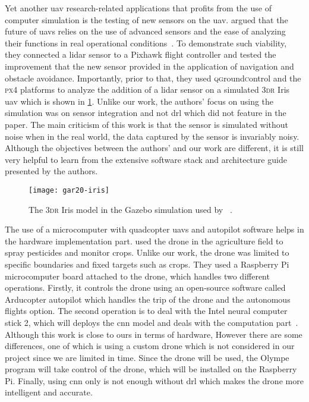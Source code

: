\documentclass[../main.tex]{subfiles}
\begin{document}
Yet another \gls{uav} research-related applications 
that profits from the use of computer simulation 
is the testing of new sensors on the \gls{uav}.
\citeauthor{Gar20} argued that the future of \glspl{uav}
relies on the use of advanced sensors and 
the ease of analyzing their functions
in real operational conditions~\cite{Gar20}.
To demonstrate such viability, they connected a \gls{lidar} sensor
to a Pixhawk flight controller and tested the improvement
that the new sensor provided
in the application of navigation and obstacle avoidance.
Importantly, prior to that, they used \textsc{qg}round\textsc{c}ontrol and the \textsc{px}4
platforms to analyze the addition of a \gls{lidar} sensor
on a simulated 3\textsc{dr} Iris \gls{uav} which is shown
in \cref{fig:gar20}.
Unlike our work, the authors' focus on using the simulation
was on sensor integration and not \gls{drl} 
which did not feature in the paper. 
The main criticism of this work is that 
the sensor is simulated without noise
when in the real world, the data captured
by the sensor is invariably noisy.
Although the objectives between the authors' and our work
are different, it is still very helpful to learn from
the extensive software stack and architecture guide 
presented by the authors.

\begin{figure}[tb] 
    \centering
    \texttt{[image: gar20-iris]} 
    \caption[The 3\textsc{dr} Iris model in the 
    Gazebo simulation used by \citeauthor{Gar20}.]
    {The 3\textsc{dr} Iris model in the 
    Gazebo simulation used by 
    \citeauthor{Gar20}~\cite[Fig.~4]{Gar20}.} 
    \label{fig:gar20} 
\end{figure}



The use of a microcomputer with quadcopter \glspl{uav} and autopilot software helps in the hardware implementation part.
\citeauthor{Khan21} used the drone in the agriculture field to spray 
pesticides and monitor crops. Unlike our work, the drone was limited to specific
boundaries and fixed targets such as crops.
They used a Raspberry Pi microcomputer board attached to the drone, which handles two different operations. Firstly, it controls the drone using an open-source
software called Arducopter autopilot which  handles the trip of the drone and the autonomous 
flights option. The second operation is to deal with the Intel neural computer stick 2, which will deploys the \gls{cnn} model and deals with the computation part~\cite{Khan21}.
Although this work is close to ours in terms of hardware, However there are some differences, 
one of which is using a custom drone which is not considered in our project since we are limited in time.
Since the \anafi drone will be used, the Olympe program will take control of the drone, which will
be installed on the Raspberry Pi. Finally, using \gls{cnn} only is not enough without \gls{drl} 
which makes the drone more intelligent and accurate.
\end{document}
